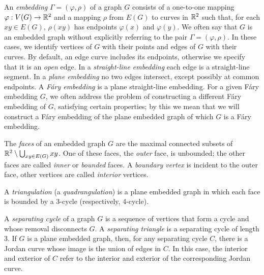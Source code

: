 An \emph{embedding} $\Gamma=(\varphi,\rho)$ of a graph $G$ consists
of a one-to-one mapping $\varphi:V(G)\to\mathbb{R}^2$ and a mapping $\rho$ from
$E(G)$ to curves in $\mathbb{R}^2$ such that, for each $xy\in E(G)$, $\rho(xy)$
has endpoints $\varphi(x)$ and $\varphi(y)$.
We often say that $G$ is an embedded graph
without explicitly referring to the pair $\Gamma=(\varphi,\rho)$.
In these cases, we identify vertices of $G$ with their
points and edges of $G$ with their curves. By default, an edge curve includes
its endpoints, otherwise we specify that it is an \emph{open} edge.
%
In a \emph{straight-line embedding} each edge is a straight-line segment. In a \emph{plane embedding} no two edges intersect, except possibly at common endpoints. A \emph{F\'ary embedding} is a plane straight-line embedding. For a given F\'ary embedding $G$, we often address the problem of constructing a different F\'ary embedding of $G$, satisfying certain properties; by this we mean that we will construct a F\'ary embedding of the plane embedded graph of which $G$ is a F\'ary embedding.

The \emph{faces} of an embedded graph $G$ are the maximal connected
subsets of $\mathbb{R}^2\setminus\bigcup_{xy\in E(G)} xy$.  One of
these faces, the \emph{outer} face, is unbounded; the other faces are called \emph{inner} or \emph{bounded} faces. A {\em boundary vertex} is incident to the outer face, other vertices are called \emph{interior} vertices.

A \emph{triangulation} (a \emph{quadrangulation}) is a plane embedded graph in which each face is bounded by a 3-cycle (respectively, 4-cycle). 

A \emph{separating cycle} of a graph $G$ is a sequence of vertices
that form a cycle and whose removal disconnects $G$.  A \emph{separating triangle} is
a separating cycle of length 3.  
If $G$ is a plane embedded graph, then,
for any separating cycle $C$, there is a 
Jordan curve whose image
is the union of edges in $C$.  In this case, the interior and exterior of
$C$ refer to the interior and exterior of the corresponding Jordan curve.

